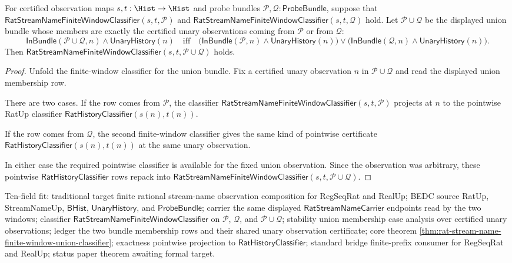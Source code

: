 \begin{theorem}
\label{thm:rat-stream-name-finite-window-union-classifier}
For certified observation maps $s,t:\Hist\to\Hist$ and probe bundles
$\mathcal{P},\mathcal{Q}:\mathsf{ProbeBundle}$, suppose that
$\mathsf{RatStreamNameFiniteWindowClassifier}(s,t,\mathcal{P})$ and
$\mathsf{RatStreamNameFiniteWindowClassifier}(s,t,\mathcal{Q})$ hold. Let
$\mathcal{P}\cup\mathcal{Q}$ be the displayed union bundle whose members are
exactly the certified unary observations coming from $\mathcal{P}$ or from
$\mathcal{Q}$:
$$
\mathsf{InBundle}(\mathcal{P}\cup\mathcal{Q},n)\land\mathsf{UnaryHistory}(n)
\quad\text{iff}\quad
\bigl(\mathsf{InBundle}(\mathcal{P},n)\land\mathsf{UnaryHistory}(n)\bigr)
\lor
\bigl(\mathsf{InBundle}(\mathcal{Q},n)\land\mathsf{UnaryHistory}(n)\bigr).
$$
Then
$\mathsf{RatStreamNameFiniteWindowClassifier}(s,t,\mathcal{P}\cup\mathcal{Q})$
holds.
\end{theorem}
\begin{proof}
Unfold the finite-window classifier for the union bundle. Fix a certified unary
observation $n$ in $\mathcal{P}\cup\mathcal{Q}$ and read the displayed union
membership row.

There are two cases. If the row comes from $\mathcal{P}$, the classifier
$\mathsf{RatStreamNameFiniteWindowClassifier}(s,t,\mathcal{P})$ projects at $n$
to the pointwise RatUp classifier
$\mathsf{RatHistoryClassifier}(s(n),t(n))$.

If the row comes from $\mathcal{Q}$, the second finite-window classifier gives
the same kind of pointwise certificate
$\mathsf{RatHistoryClassifier}(s(n),t(n))$ at the same unary observation.

In either case the required pointwise classifier is available for the fixed
union observation. Since the observation was arbitrary, these pointwise
$\mathsf{RatHistoryClassifier}$ rows repack into
$\mathsf{RatStreamNameFiniteWindowClassifier}(s,t,\mathcal{P}\cup\mathcal{Q})$.
\end{proof}

Ten-field fit: traditional target finite rational stream-name observation
composition for RegSeqRat and RealUp; BEDC source RatUp, StreamNameUp,
$\mathsf{BHist}$, $\mathsf{UnaryHistory}$, and $\mathsf{ProbeBundle}$; carrier
the same displayed $\mathsf{RatStreamNameCarrier}$ endpoints read by the two
windows; classifier $\mathsf{RatStreamNameFiniteWindowClassifier}$ on
$\mathcal{P}$, $\mathcal{Q}$, and $\mathcal{P}\cup\mathcal{Q}$; stability union
membership case analysis over certified unary observations; ledger the two
bundle membership rows and their shared unary observation certificate; core
theorem \autoref{thm:rat-stream-name-finite-window-union-classifier}; exactness
pointwise projection to $\mathsf{RatHistoryClassifier}$; standard bridge
finite-prefix consumer for RegSeqRat and RealUp; status paper theorem awaiting
formal target.

